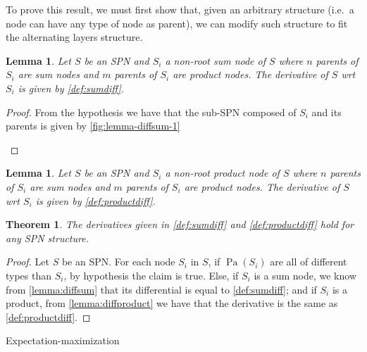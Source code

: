 \documentclass{amsart}
\makeatletter
\def\subsection{\@startsection{subsection}{3}%
  \z@{.5\linespacing\@plus.7\linespacing}{.1\linespacing}%
  {\normalfont}}
\DeclareMathOperator*{\Pa}{\text{Pa}}
\theoremstyle{plain}
\newcounter{dummy-def}\numberwithin{dummy-def}{section}
\newcounter{dummy-thm}\numberwithin{dummy-thm}{section}
\newtheorem{theorem}[dummy-thm]{Theorem}
\newcounter{dummy-prop}\numberwithin{dummy-prop}{section}
\newcounter{dummy-corollary}\numberwithin{dummy-corollary}{section}
\newcounter{dummy-lemma}\numberwithin{dummy-lemma}{section}
\newtheorem{lemma}[dummy-lemma]{Lemma}
\newcounter{dummy-ex}\numberwithin{dummy-ex}{section}
\newcounter{dummy-eg}\numberwithin{dummy-eg}{section}
\numberwithin{equation}{section}
\makeatother
\begin{document}
To prove this result, we must first show that, given an arbitrary structure (i.e.\ a node can
have any type of node as parent), we can modify such structure to fit the alternating layers
structure.

\begin{lemma}\label{lemma:diffsum} Let $S$ be an SPN and $S_i$ a non-root sum node of $S$ where $n$
  parents of $S_i$ are sum nodes and $m$ parents of $S_i$ are product nodes. The derivative of $S$
  wrt $S_i$ is given by \autoref{def:sumdiff}.
\end{lemma}
\begin{proof}
  From the hypothesis we have that the sub-SPN composed of $S_i$ and its parents is given by
  \autoref{fig:lemma-diffsum-1}
  \begin{figure}[h]
    \centering
    \begin{tikzpicture}[>=latex',line join=bevel]
    \end{tikzpicture}
  \end{figure}
\end{proof}

\begin{lemma}\label{lemma:diffproduct} Let $S$ be an SPN and $S_i$ a non-root product node of $S$ where
  $n$ parents of $S_i$ are sum nodes and $m$ parents of $S_i$ are product nodes. The derivative of
  $S$ wrt $S_i$ is given by \autoref{def:productdiff}.
\end{lemma}

\begin{theorem} The derivatives given in \autoref{def:sumdiff} and \autoref{def:productdiff}
  hold for any SPN structure.
\end{theorem}
\begin{proof}
  Let $S$ be an SPN\@. For each node $S_i$ in $S$, if $\Pa(S_i)$ are all of different types than
  $S_i$, by hypothesis the claim is true. Else, if $S_i$ is a sum node, we know from
  \autoref{lemma:diffsum} that its differential is equal to \autoref{def:sumdiff}; and if $S_i$ is
  a product, from \autoref{lemma:diffproduct} we have that the derivative is the same as
  \autoref{def:productdiff}.
\end{proof}

\subsection{Expectation-maximization}


\printbibliography[]
\end{document}

